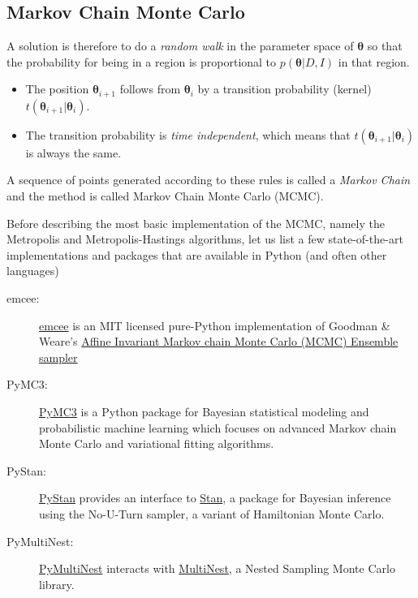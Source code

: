 \documentclass[%
oneside,                 %
final,                   %
10pt]{article}
\begin{document}
\subsection{Markov Chain Monte Carlo}
A solution is therefore to do a \emph{random walk} in the parameter space of $\boldsymbol{\theta}$ so that the probability for being in a region is proportional to $p( \boldsymbol{\theta} | D,I)$ in that region.
\begin{itemize}
\item The position $\boldsymbol{\theta}_{i+1}$ follows from $\boldsymbol{\theta}_i$ by a transition probability (kernel) $t ( \boldsymbol{\theta}_{i+1} | \boldsymbol{\theta}_i )$.

\item The transition probability is \emph{time independent}, which means that $t ( \boldsymbol{\theta}_{i+1} | \boldsymbol{\theta}_i )$ is always the same.
\end{itemize}

\noindent
A sequence of points generated according to these rules is called a \emph{Markov Chain} and the method is called Markov Chain Monte Carlo (MCMC).

Before describing the most basic implementation of the MCMC, namely the Metropolis and Metropolis-Hastings algorithms, let us list a few state-of-the-art implementations and packages that are available in Python (and often other languages)

\begin{description}
\item[emcee:] 
  \href{{https://emcee.readthedocs.io/en/latest/}}{emcee} is an MIT licensed pure-Python implementation of Goodman {\&} Weare’s \href{{http://msp.berkeley.edu/camcos/2010/5-1/p04.xhtml}}{Affine Invariant Markov chain Monte Carlo (MCMC) Ensemble sampler}

\item[PyMC3:] 
  \href{{https://docs.pymc.io/}}{PyMC3} is a Python package for Bayesian statistical modeling and probabilistic machine learning which focuses on advanced Markov chain Monte Carlo and variational fitting algorithms.

\item[PyStan:] 
  \href{{https://pystan.readthedocs.io/en/latest/}}{PyStan} provides an interface to \href{{http://mc-stan.org/}}{Stan}, a package for Bayesian inference using the No-U-Turn sampler, a variant of Hamiltonian Monte Carlo.

\item[PyMultiNest:] 
  \href{{https://johannesbuchner.github.io/PyMultiNest/}}{PyMultiNest} interacts with \href{{https://github.com/farhanferoz/MultiNest}}{MultiNest}, a Nested Sampling Monte Carlo library.
\end{description}
\end{document}
